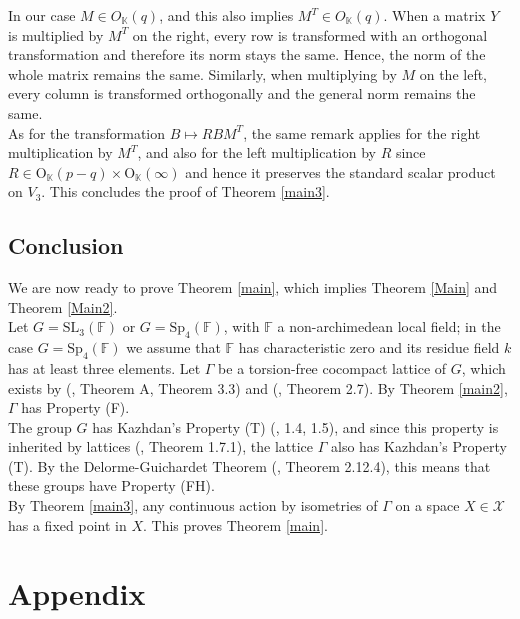 \documentclass{article}
\theoremstyle{definition}
\theoremstyle{remark}
\theoremstyle{plain}
\begin{document}
In our case $M\in O_{\mathbb{K}}(q)$, and this also implies $M^T\in O_{\mathbb{K}}(q)$. When a matrix $Y$ is multiplied by $M^T$ on the right, every row is transformed with an orthogonal transformation and therefore its norm stays the same. Hence, the norm of the whole matrix remains the same. Similarly, when multiplying by $M$ on the left, every column is transformed orthogonally and the general norm remains the same. \\

As for the transformation $B\mapsto R B M^T$, the same remark applies for the right multiplication by $M^T$, and also for the left multiplication by $R$ since $R\in\mathrm{O}_\mathbb{K}(p-q)\times\mathrm{O}_\mathbb{K}(\infty)$ and hence it preserves the standard scalar product on $V_3$. This concludes the proof of Theorem \ref{main3}. \\

\subsection{Conclusion}

We are now ready to prove Theorem \ref{main}, which implies Theorem \ref{Main} and Theorem \ref{Main2}. \\

Let $G=\mathrm{SL}_3(\mathbb{F})$ or $G=\mathrm{Sp}_4(\mathbb{F})$, with $\mathbb{F}$ a non-archimedean local field; in the case $G=\mathrm{Sp}_4(\mathbb{F})$ we assume that $\mathbb{F}$ has characteristic zero and its residue field $k$ has at least three elements. Let $\Gamma$ be a torsion-free cocompact lattice of $G$, which exists by (\cite{borelharder}, Theorem A, Theorem 3.3) and (\cite{garland}, Theorem 2.7). By Theorem \ref{main2}, $\Gamma$ has Property (F). \\

The group $G$ has Kazhdan's Property (T) (\cite{kazhdanT}, 1.4, 1.5), and since this property is inherited by lattices (\cite{kazhdanT}, Theorem 1.7.1), the lattice $\Gamma$ also has Kazhdan's Property (T). By the Delorme-Guichardet Theorem (\cite{kazhdanT}, Theorem 2.12.4), this means that these groups have Property (FH). \\

By Theorem \ref{main3}, any continuous action by isometries of $\Gamma$ on a space $X\in\mathcal{X}$ has a fixed point in $X$. This proves Theorem \ref{main}. \\

\appendix
\section{Appendix}
\end{document}
